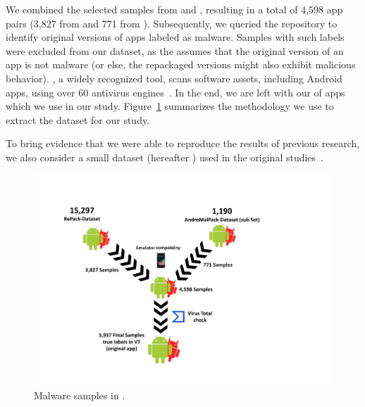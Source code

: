 
We combined the selected samples from \repack and \amc, resulting in a total of 4,598 app
pairs (3,827 from \repack and 771 from \amc). Subsequently, we queried the \vt repository
to identify original versions of apps labeled as malware. Samples with such labels were excluded from our dataset,
as the \mas assumes that the original version of an app is not malware (or else, the repackaged versions might
also exhibit malicious behavior). \vt, a widely recognized tool, scans software assets, including Android apps,
using over 60 antivirus engines~\cite{DBLP:journals/ese/KhanmohammadiEH19}. In the end, we are left with our \cds of \apps apps which we use in our study. Figure~\ref{fig:dataset} summarizes the methodology we use to extract the dataset for our study.

To bring evidence that we were able to reproduce the results of previous research, we also consider a small dataset (hereafter \sds)
used in the original studies~\cite{DBLP:conf/wcre/BaoLL18,DBLP:journals/jss/CostaMMSSBNR22}.


  \begin{figure}[htb]
   \includegraphics[width=\columnwidth]{images/dataSet_V2.pdf}
   \caption{Malware samples in \cds.}
   \label{fig:dataset}
 \end{figure}



